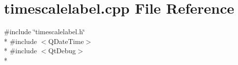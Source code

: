 \section{timescalelabel.\+cpp File Reference}
\label{bk3_2scalelabels_2timescalelabel_8cpp}
{\ttfamily \#include \char`\"{}timescalelabel.\+h\char`\"{}}\\*
{\ttfamily \#include $<$Q\+Date\+Time$>$}\\*
{\ttfamily \#include $<$Qt\+Debug$>$}\\*
